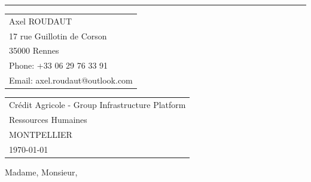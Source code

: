 \documentclass{article}
\begin{document}


\vspace{-1em} %

\rule{\linewidth}{1pt} %

\bigskip\bigskip %


\begin{tabular}{@{} l}
	Axel ROUDAUT \\
	17 rue Guillotin de Corson \\ %
	35000 Rennes \\
	Phone: +33 06 29 76 33 91 \\
	Email: axel.roudaut@outlook.com
\end{tabular}


\hfill
\begin{tabular}{l @{}}
	Crédit Agricole - Group Infrastructure Platform \\
	Ressources Humaines \\ %
	MONTPELLIER \\
\today \bigskip\\ %
\end{tabular}

\bigskip %


\bigskip %

Madame, Monsieur,

\bigskip %

\end{document}
